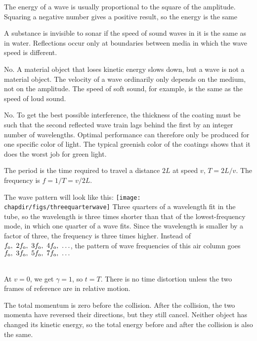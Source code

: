  The energy of a wave is usually proportional
to the square of the amplitude. Squaring a negative number
gives a positive result, so the energy is the same

 A substance is invisible to sonar if the speed of sound
waves in it is the same as  in water. Reflections occur only
at boundaries between media in which the wave speed is
different.

 No. A material object that loses kinetic energy slows down,
but a wave is not a material object. The velocity of a wave
ordinarily only depends on the medium, not on the amplitude.
The speed of soft sound, for example,  is the same as the
speed of loud sound.

 No. To get the best possible interference, the thickness of
the coating must be such that the second reflected wave
train lags behind the first by an integer number of
wavelengths. Optimal performance can therefore only be
produced for one specific color of light. The typical
greenish color of the coatings shows that it does the worst
job for green light.

 The period is the
time required to travel a distance $2L$ at speed $v$, $T=2L/v$.
The frequency is $f=1/T=v/2L$.

 The wave pattern
will look like this:   
\texttt{[image: \\chapdir/figs/threequarterwave]}
Three quarters of a wavelength fit
in the tube, so the wavelength is three times shorter than
that of the lowest-frequency mode, in which one quarter of a
wave fits. Since the wavelength is smaller by a factor of
three, the frequency is three times higher. Instead of
$f_\zu{o},\ 2f_\zu{o},\ 3f_\zu{o},\ 4f_\zu{o},\ \ldots$, the pattern of wave frequencies of this
air column goes $f_\zu{o},\ 3f_\zu{o},\ 5f_\zu{o},\ 7f_\zu{o},\ \ldots$


\noindent{}\\
 At $v=0$, we get $\gamma=1$, so $t=T$. There is
no time distortion unless the two frames of reference are in relative motion.

 The total momentum is zero before the collision. After the
collision, the two momenta have reversed their directions, but they still cancel.
Neither object has changed its kinetic energy, so the total energy before and after the collision
is also the same.

